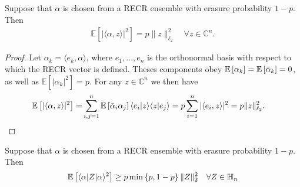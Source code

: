 \begin{lemma}
Suppose that $\alpha$ is chosen from a RECR ensemble with erasure probability $1-p$. Then
\begin{align*}
  \mathbb{E} \left[ | \langle  \alpha, z \rangle|^2 \right] = p \|  z \|_{\ell_2}^2
  \quad \forall  z \in \mathbb{C}^n.
\end{align*}
\end{lemma}

\begin{proof}
Let $\alpha_k = \langle  e_k, \alpha\rangle$, where $ e_1,\ldots, e_n$ is the orthonormal basis with respect to which the RECR vector is defined.
Theses components obey $\mathbb{E}\left[ \alpha_k \right] = \mathbb{E} \left[ \bar{\alpha}_k \right] = 0$, as well as $\mathbb{E} \left[ |\alpha_k|^2 \right] = p$.
For any $ z \in \mathbb{C}^n$ we then have
\begin{align*}
  \mathbb{E} \left[| \langle  \alpha,  z\rangle |^2 \right]
  =& \sum_{i,j=1}^n \mathbb{E} \left[ \bar{\alpha}_i \alpha_j \right] \langle  e_i |  z \rangle \langle  z |  e_j \rangle = p \sum_{i=1}^n | \langle  e_i,  z \rangle|^2 = p \|  z \|_{\ell_2}^2.
\end{align*}
\end{proof}

\begin{lemma}
  \label{lem:recr_subisotropic}
  Suppose that $\alpha$ is chosen from a RECR ensemble with erasure probability $1-p$. Then
  \begin{equation*}
  \mathbb{E} \left[ \langle  \alpha| Z | \alpha \rangle^2 \right] \geq p \min \left\{ p, 1-p \right\} \| Z \|_2^2 \quad \forall Z \in \mathbb{H}_n
  \end{equation*}
\end{lemma}

